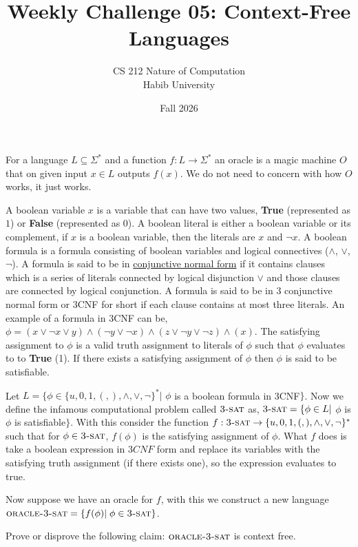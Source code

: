 \documentclass[a4paper]{exam}
\title{Weekly Challenge 05: Context-Free Languages}
\author{CS 212 Nature of Computation\\Habib University}
\date{Fall 2026}
\newcommand{\prob}{\textsc{oracle-3-sat}} %
\begin{document}
\maketitle


\begin{questions}
    \question For a language $L \subseteq \Sigma^*$ and a function $f: L \to \Sigma^*$ an oracle is a magic machine $O$ that on given input $x \in L$ outputs $f(x)$. We do not need to concern with how $O$ works, it just works. 

    A boolean variable $x$ is a variable that can have two values, \textbf{True} (represented as $1$) or \textbf{False} (represented as $0$). A boolean literal is either a boolean variable or its complement, if $x$ is a boolean variable, then the literals are $x$ and $\neg x$. A boolean formula is a formula consisting of boolean variables and logical connectives ($\land$, $\lor$, $\neg$). A formula is said to be in \href{https://en.wikipedia.org/wiki/Conjunctive_normal_form}{conjunctive normal form} if it contains clauses which is a series of literals connected by logical disjunction $\lor$ and those clauses are connected by logical conjunction. A formula is said to be in 3 conjunctive normal form or 3CNF for short if each clause contains at most three literals. An example of a formula in 3CNF can be, $\phi = (x \lor \neg x \lor y) \land (\neg y \lor \neg x) \land (z \lor \neg y \lor \neg z) \land (x)$. The satisfying assignment to $\phi$ is a valid truth assignment to literals of $\phi$ such that $\phi$ evaluates to to \textbf{True} (1). If there exists a satisfying assignment of $\phi$ then $\phi$ is said to be satisfiable.

    Let $L = \{\phi \in \{u,0,1,(,),\land, \lor, \neg\}^*|$ $\phi$ is a boolean formula in 3CNF$\}$. Now we define the infamous computational problem called \href{https://en.wikipedia.org/wiki/Boolean_satisfiability_problem}{$\textsc{3-sat}$} as, $\textsc{3-sat} = \{\phi \in L|$ $\phi$ is $\phi$ is satisfiable$\}$. 
    With this consider the function $f:\textsc{3-sat} \to \{u,0,1,(,),\land, \lor, \neg\}^*$ such that for $\phi \in \textsc{3-sat}$, $f(\phi)$ is the satisfying assignment of $\phi$. What $f$ does is take a boolean expression in $3CNF$ form and replace its variables with the satisfying truth assignment (if there exists one), so the expression evaluates to true.
    
    Now suppose we have an oracle for $f$, with this we construct a new language $\prob = \{f(\phi) | \; \phi \in \textsc{3-sat}\}$.
    
    Prove or disprove the following claim: $\prob$ is context free.
    
    \begin{solution}
    \end{solution}


\end{questions}
\end{document}
